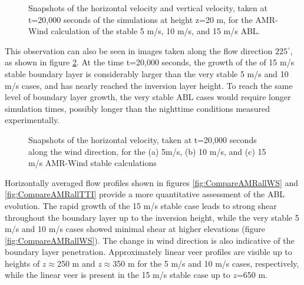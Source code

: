\begin{figure}[hbt!]
\begin{tikzpicture}
  \end{tikzpicture}
  \caption{ \label{fig:SnapshotsZ20} Snapshots of the horizontal
    velocity and vertical velocity, taken at t=20,000 seconds of the
    simulations at height z=20 m, for the AMR-Wind calculation of the
    stable 5 m/s, 10 m/s, and 15 m/s ABL. }
\end{figure}

This observation can also be seen in images taken along the flow
direction $225^\circ$, as shown in figure
\ref{fig:SnapshotsSide}.  At the time t=20,000 seconds, the growth of the
of 15 m/s stable boundary layer is considerably larger than the very
stable 5 m/s and 10 m/s cases, and has nearly reached the inversion
layer height.  To reach the same level of boundary layer growth, the
very stable ABL cases would require longer simulation times, possibly
longer than the nighttime conditions measured experimentally.

\begin{figure}[hbt!]
  \centering
  \caption{ \label{fig:SnapshotsSide} Snapshots of the horizontal
    velocity, taken at t=20,000 seconds along the wind direction, for
    the (a) 5m/s, (b) 10 m/s, and (c) 15 m/s AMR-Wind stable
    calculations }

\end{figure}

Horizontally averaged flow profiles shown in figures
\ref{fig:CompareAMRallWS} and \ref{fig:CompareAMRallTTI} provide a
more quantitative assessment of the ABL evolution.  The rapid growth
of the 15 m/s stable case leads to strong shear throughout the
boundary layer up to the inversion height, while the very stable 5 m/s
and 10 m/s cases showed minimal shear at higher elevations (figure \ref{fig:CompareAMRallWS}).  The
change in wind direction is also indicative of the boundary layer
penetration.  Approximately linear veer profiles are visible up to
heights of $z\approx$250 m and $z\approx$350 m for the 5 m/s and 10
m/s cases, respectively, while the linear veer is present in the 15
m/s stable case up to $z$=650 m.

